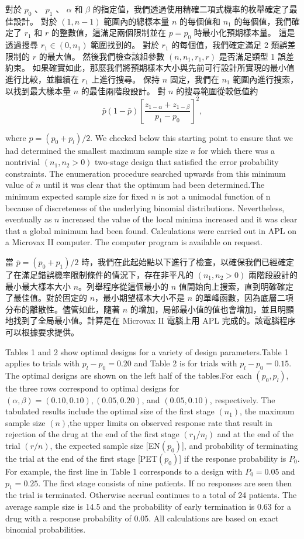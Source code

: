 	對於 $p_0$ 、 $p_1$ 、 $\alpha$ 和 $\beta$ 的指定值，我們透過使用精確二項式機率的枚舉確定了最佳設計。 對於 $(1,n-1)$ 範圍內的總樣本量 $n$ 的每個值和 $n_1$ 的每個值，我們確定了 $r_1$ 和 $r$ 的整數值，這滿足兩個限制並在 $p = p_0$ 時最小化預期樣本量。 這是透過搜尋 $r_1 \in (0,n_1)$ 範圍找到的。 對於 $r_1$ 的每個值，我們確定滿足 2 類誤差限制的 $r$ 的最大值。 然後我們檢查該組參數 $(n,n_1,r_1,r)$ 是否滿足類型 1 誤差約束。 如果確實如此，那麼我們將預期樣本大小與先前可行設計所實現的最小值進行比較，並繼續在 $r_1$ 上進行搜尋。 保持 $n$ 固定，我們在 $n_1$ 範圍內進行搜索，以找到最大樣本量 $n$ 的最佳兩階段設計。 對 $n$ 的搜尋範圍從較低值約
$$\bar{p}(1-\bar{p}) \left[ \frac{z_{1-\alpha}+z_{1-\beta}}{p_1-p_0}\right]^2,$$

	where $p = (p_0 + p_l)/2$. We checked below this starting point to ensure that we had determined the smallest maximum sample size $n$ for which there was a nontrivial $(n_1,n_2 > 0)$ two-stage design that satisfied the error probability constraints. The enumeration procedure searched upwards from this minimum value of $n$ until it was clear that the optimum had been determined.The minimum expected sample size for fixed $n$ is not a unimodal function of n because of discreteness of the underlying binomial distributions. Nevertheless, eventually as $n$ increased the value of the local minima increased and it was clear that a global minimum had been found. Calculations were carried out in APL on a Microvax II computer. The computer program is available on request.


	當 $\bar{p} = (p_0 + p_1)/2$ 時，我們在此起始點以下進行了檢查，以確保我們已經確定了在滿足錯誤機率限制條件的情況下，存在非平凡的 $(n_1,n_2 > 0)$ 兩階段設計的最小最大樣本大小 $n$。列舉程序從這個最小的 $n$ 值開始向上搜索，直到明確確定了最佳值。對於固定的 $n$，最小期望樣本大小不是 $n$ 的單峰函數，因為底層二項分布的離散性。儘管如此，隨著 $n$ 的增加，局部最小值的值也會增加，並且明顯地找到了全局最小值。計算是在 Microvax II 電腦上用 APL 完成的。該電腦程序可以根據要求提供。

	Tables 1 and 2 show optimal designs for a variety of design parameters.Table 1 applies to trials with $p_l - p_0 = 0.20$ and Table 2 is for trials with $p_l - p_0 = 0.15$. The optimal designs are shown on the left half of the tables.For each $(p_0, p_l)$, the three rows correspond to optimal designs for $(\alpha,\beta) = (0.10,0.10),(0.05,0.20)$, and $(0.05,0.10)$, respectively. The tabulated results include the optimal size of the first stage $(n_1)$, the maximum sample size $(n)$,the upper limits on observed response rate that result in rejection of the drug at the end of the first stage $(r_1/n_l)$ and at the end of the trial $(r/n)$, the expected sample size [EN$(p_0)$], and probability of terminating the trial at the end of the first stage [PET$(p_0)$] if the response probability is $P_0$. For example, the first line in Table 1 corresponds to a design with $P_0 = 0.05$  and $p_1 = 0.25$. The first stage consists of nine patients. If no responses are seen then the trial is terminated. Otherwise accrual continues to a total of 24 patients. The average sample size is 14.5 and the probability of early termination is 0.63 for a drug with a response probability of 0.05. All calculations are based on exact binomial probabilities. 

